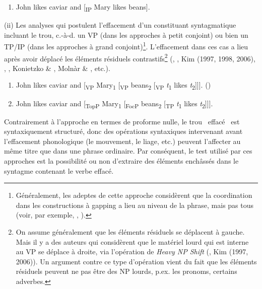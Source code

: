 \begin{enumerate}
\item John likes\textsubscript{} caviar and [\textsubscript{IP} Mary likes beans].  


\end{enumerate}
(ii) Les analyses qui postulent l'effacement d'un constituant syntagmatique incluant le trou, c.-à-d. un VP (dans les approches à petit conjoint) ou bien un TP/IP (dans les approches à grand conjoint)\footnote{Généralement, les adeptes de cette approche considèrent que la coordination dans les constructions à gapping a lieu au niveau de la phrase, mais pas tous (voir, par exemple, \citet{Coppock2001}, \citet{Lin2002}).}. L'effacement dans ces cas a lieu après avoir déplacé les éléments résiduels contrastifs\footnote{On assume généralement que les éléments résiduels se déplacent à gauche. Mais il y a des auteurs qui considèrent que le matériel lourd qui est interne au VP se déplace à droite, via l'opération de \textit{Heavy NP Shift} (\citet{Jayaseelan1990}, Kim (1997, 2006)). Un argument contre ce type d'opération vient du fait que les éléments résiduels peuvent ne pas être des NP lourds, p.ex. les pronoms, certains adverbes. }  (\citet{Sag1976}, \citet{Jayaseelan1990}, Kim (1997, 1998, 2006), \citet{Coppock2001}, \citet{Lin2002}, Konietzko \& \citet{Winkler2010}, Molnàr \& \citet{Winkler2010}, etc.).


\begin{enumerate}
\item John likes\textsubscript{} caviar and [\textsubscript{VP} Mary\textsubscript{1} [\textsubscript{VP} beans\textsubscript{2} [\textsubscript{VP} \textit{t}\textsubscript{1} likes \textit{t}\textsubscript{2}]]].      (\citet{Coppock2001}) 

\item John likes\textsubscript{} caviar and [\textsubscript{TopP} Mary\textsubscript{1} [\textsubscript{FocP} beans\textsubscript{2} [\textsubscript{TP} \textit{t}\textsubscript{1} likes \textit{t}\textsubscript{2}]]].  


\end{enumerate}
Contrairement à l'approche en termes de proforme nulle, le trou {\guillemotleft}~effacé~{\guillemotright} est syntaxiquement structuré, donc des opérations syntaxiques intervenant avant l'effacement phonologique (le mouvement, le liage, etc.) peuvent l'affecter au même titre que dans une phrase ordinaire. Par conséquent, le test utilisé par ces approches est la possibilité ou non d'extraire des éléments enchâssés dans le syntagme contenant le verbe effacé.

